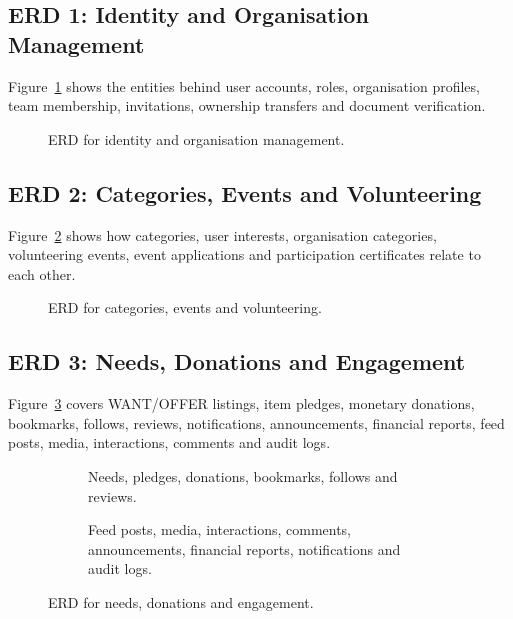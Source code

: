 \clearpage
\subsection{ERD 1: Identity and Organisation Management}

Figure~\ref{fig:erd-identity} shows the entities behind user accounts, roles, organisation profiles, team membership, invitations, ownership transfers and document verification.

\begin{figure}[H]
    \centering
    \caption{ERD for identity and organisation management.}
    \label{fig:erd-identity}
\end{figure}

\clearpage
\subsection{ERD 2: Categories, Events and Volunteering}

Figure~\ref{fig:erd-events} shows how categories, user interests, organisation categories, volunteering events, event applications and participation certificates relate to each other.

\begin{figure}[H]
    \centering
    \caption{ERD for categories, events and volunteering.}
    \label{fig:erd-events}
\end{figure}

\clearpage
\subsection{ERD 3: Needs, Donations and Engagement}

Figure~\ref{fig:erd-engagement} covers WANT/OFFER listings, item pledges, monetary donations, bookmarks, follows, reviews, notifications, announcements, financial reports, feed posts, media, interactions, comments and audit logs.

\begin{figure}[H]
    \centering
    \begin{subfigure}[t]{\textwidth}
        \centering
        \caption{Needs, pledges, donations, bookmarks, follows and reviews.}
    \end{subfigure}
    \par\vspace{0.2in}
    \begin{subfigure}[t]{\textwidth}
        \centering
        \caption{Feed posts, media, interactions, comments, announcements, financial reports, notifications and audit logs.}
    \end{subfigure}
    \caption{ERD for needs, donations and engagement.}
    \label{fig:erd-engagement}
\end{figure}

